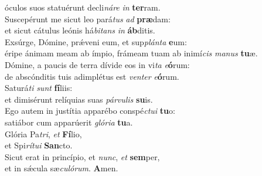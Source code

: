 \evenverse óculos suos statuérunt decli\textit{ná}\textit{re} \textit{in} \textbf{ter}ram.\\
\oddverse Suscepérunt me sicut leo pará\textit{tus} \textit{ad} \textbf{præ}dam:~\*\\
\oddverse et sicut cátulus leónis há\textit{bi}\textit{tans} \textit{in} \textbf{áb}ditis.\\
\evenverse Exsúrge, Dómine, prǽveni eum, et sup\textit{plán}\textit{ta} \textbf{e}um:~\*\\
\evenverse éripe ánimam meam ab ímpio, frámeam tuam ab inimí\textit{cis} \textit{ma}\textit{nus} \textbf{tu}æ.\\
\oddverse Dómine, a paucis de terra dívide eos in vi\textit{ta} \textit{e}\textbf{ó}rum:~\*\\
\oddverse de abscónditis tuis adimplétus est \textit{ven}\textit{ter} \textit{e}\textbf{ó}rum.\\
\evenverse Saturá\textit{ti} \textit{sunt} \textbf{fí}liis:~\*\\
\evenverse et dimisérunt relíquias suas \textit{pár}\textit{vu}\textit{lis} \textbf{su}is.\\
\oddverse Ego autem in justítia apparébo conspé\textit{ctu}\textit{i} \textbf{tu}o:~\*\\
\oddverse satiábor cum apparúerit \textit{gló}\textit{ri}\textit{a} \textbf{tu}a.\\
\evenverse Glória Pa\textit{tri}, \textit{et} \textbf{Fí}lio,~\*\\
\evenverse et Spi\textit{rí}\textit{tu}\textit{i} \textbf{San}cto.\\
\oddverse Sicut erat in princípio, et \textit{nunc}, \textit{et} \textbf{sem}per,~\*\\
\oddverse et in sǽcula sæ\textit{cu}\textit{ló}\textit{rum}. \textbf{A}men.\\
